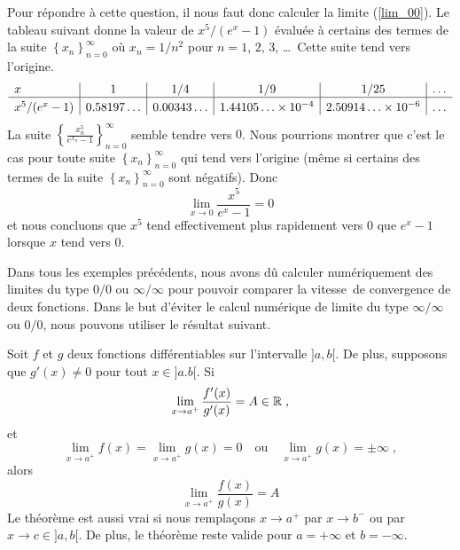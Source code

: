 {\begin{egg}
Pour répondre à cette question, il nous faut donc calculer la limite
(\ref{lim_00}).   Le tableau suivant donne la valeur de $x^5/(e^x-1)$
évaluée à certains des termes de la suite 
$\displaystyle \left\{ x_n \right\}_{n=0}^\infty$ où $x_n = 1/n^2$
pour $n=1$, $2$, $3$, \ldots\  Cette suite tend vers l'origine.
\[
\begin{array}{l|c|c|c|c|c}
x & 1 & 1/4 & 1/9 & 1/25 & \ldots \\
\hline
\rule[-0.2ex]{0em}{1.2em} x^5/(e^x-1) & 0.58197\ldots & 0.00343\ldots &
1.44105\ldots\times 10^{-4} & 2.50914\ldots \times 10^{-6} & \ldots
\end{array}
\]
La suite
$\displaystyle \left\{ \frac{x_n^5}{e^{x_n}-1} \right\}_{n=0}^\infty$
semble tendre vers $0$.  Nous pourrions montrer que c'est le cas pour
toute suite $\displaystyle \left\{ x_n \right\}_{n=0}^\infty$ qui tend
vers l'origine (même si certains des termes de la suite
$\displaystyle \left\{ x_n \right\}_{n=0}^\infty$ sont négatifs).
Donc
\[
\lim_{x\rightarrow 0} \frac{x^5}{e^x-1} = 0
\]
et nous concluons que $x^5$ tend effectivement plus rapidement vers $0$
que $e^x-1$ lorsque $x$ tend vers $0$.
\label{egg_hosp3}
\end{egg}


Dans tous les exemples précédents, nous avons dû calculer
numériquement des limites du type $0/0$ ou $\infty/\infty$ pour
pouvoir comparer la \lgm vitesse\rgm\ de convergence de deux
fonctions.  Dans le but d'éviter le calcul numérique de limite du type
$\infty/\infty$ ou $0/0$, nous pouvons utiliser le résultat suivant.

\begin{focus}{\thm} 
Soit $f$ et $g$ deux fonctions différentiables sur
l'intervalle $]a,b[$.  De plus, supposons que $g'(x) \neq 0$ pour tout
$x\in ]a.b[$.  Si
\[
\lim_{x\rightarrow a^+} \frac{f'(x)}{g'(x)} = A \in \mathbb{R} \; ,
\]
et
\[
\lim_{x\rightarrow a^+} f(x) = \lim_{x\rightarrow a^+} g(x) = 0
\quad \text{ou} \quad
\lim_{x\rightarrow a^+} g(x) = \pm \infty \; ,
\]
alors
\[
\lim_{x\rightarrow a^+} \frac{f(x)}{g(x)} = A
\]
Le théorème est aussi vrai si nous remplaçons $x\rightarrow a^+$ par
$x\rightarrow b^-$ ou par $x \to c \in ]a,b[$.  De plus, le théorème
reste valide pour $a=+\infty$ et $b=-\infty$.
\end{focus}

}
